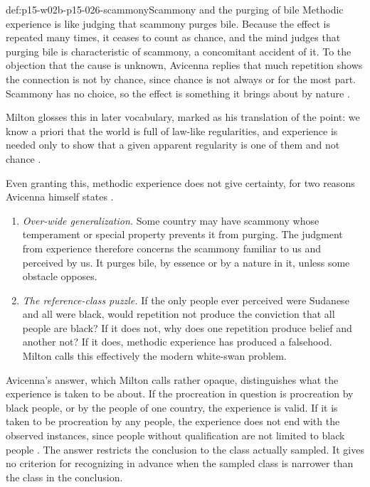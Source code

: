 \begin{hbexample}{def:p15-w02b-p15-026-scammony}{Scammony and the purging of bile}
Methodic experience is like judging that scammony purges bile. Because the
effect is repeated many times, it ceases to count as chance, and the mind
judges that purging bile is characteristic of scammony, a concomitant
accident of it. To the objection that the cause is unknown, Avicenna
replies that much repetition shows the connection is not by chance, since
chance is not always or for the most part. Scammony has no choice, so the
effect is something it brings about by nature
\cite[p.~15]{Milton2011InductionBeforeHume}.

Milton glosses this in later vocabulary, marked as his translation of the
point: we know a priori that the world is full of law-like regularities,
and experience is needed only to show that a given apparent regularity is
one of them and not chance \cite[p.~15]{Milton2011InductionBeforeHume}.
\end{hbexample}

Even granting this, methodic experience does not give certainty, for two
reasons Avicenna himself states \cite[pp.~15--16]{Milton2011InductionBeforeHume}.
\begin{enumerate}
\item \emph{Over-wide generalization.} Some country may have scammony
  whose temperament or special property prevents it from purging. The
  judgment from experience therefore concerns the scammony familiar to us
  and perceived by us. It purges bile, by essence or by a nature in it,
  unless some obstacle opposes.
\item \emph{The reference-class puzzle.} If the only people ever
  perceived were Sudanese and all were black, would repetition not produce
  the conviction that all people are black? If it does not, why does one
  repetition produce belief and another not? If it does, methodic
  experience has produced a falsehood. Milton calls this effectively the
  modern white-swan problem.
\end{enumerate}
Avicenna's answer, which Milton calls rather opaque, distinguishes what
the experience is taken to be about. If the procreation in question is
procreation by black people, or by the people of one country, the
experience is valid. If it is taken to be procreation by any people, the
experience does not end with the observed instances, since people
without qualification are not limited to black people
\cite[p.~16]{Milton2011InductionBeforeHume}. The answer restricts the
conclusion to the class actually sampled. It gives no criterion for
recognizing in advance when the sampled class is narrower than the class
in the conclusion.


